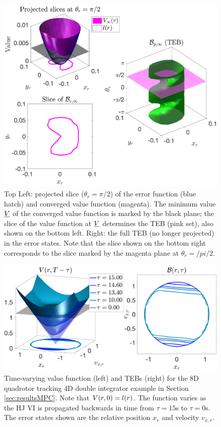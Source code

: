 \begin{figure}
	\includegraphics[width=\columnwidth]{fig/valfunc_illustration}
	\caption{Top Left: projected slice ($\theta_r = \pi/2$) of the error function (blue hatch) and converged value function (magenta). The minimum value $\underline{V}$ of the converged value function is marked by the black plane; the slice of the value function at $\underline{V}$ determines the TEB (pink set), also shown on the bottom left.
		Right: the full TEB (no longer projected) in the error states. Note that the slice shown on the bottom right corresponds to the slice marked by the magenta plane at $\theta_r = /pi/2$.}
	\label{fig:valfunc_illustration}  
\end{figure}

\begin{figure}
	\centering
	\includegraphics[width=\columnwidth]{fig/tv_valfunc}
	\caption{Time-varying value function (left) and TEBs (right) for the 8D quadrotor tracking 4D double integrator example in Section \ref{sec:resultsMPC}. Note that $V(r,0) = l(r)$. The function varies as the HJ VI is propagated backwards in time from $\tau = 15$s to $\tau = 0$s. The error states shown are the relative position $x_r$ and velocity $v_{x,r}$.}  
	\label{fig:vf_TEB:8D4D}
\end{figure} 


